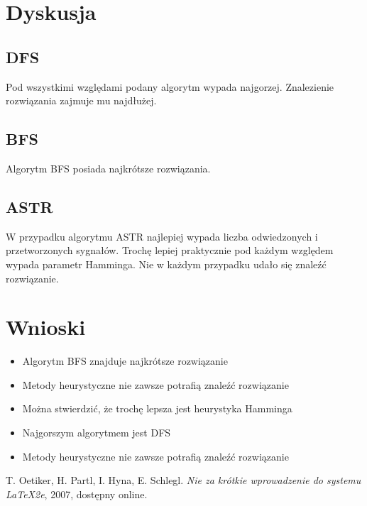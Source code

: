 \documentclass{classrep}
\begin{document}
    \section{Dyskusja} {
        \subsection{DFS}{
            Pod wszystkimi względami podany algorytm wypada najgorzej. Znalezienie rozwiązania zajmuje mu najdłużej.
        }
    
        \subsection{BFS}{
            Algorytm BFS posiada najkrótsze rozwiązania.
        }
    
        \subsection{ASTR}{
            W przypadku algorytmu ASTR najlepiej wypada liczba odwiedzonych i przetworzonych sygnałów. Trochę lepiej praktycznie pod każdym względem wypada parametr Hamminga. Nie w każdym przypadku udało się znaleźć rozwiązanie.
        }
    }

    \section{Wnioski} {
        \begin{itemize}
            \item Algorytm BFS znajduje najkrótsze rozwiązanie
            \item Metody heurystyczne nie zawsze potrafią znaleźć rozwiązanie
            \item Można stwierdzić, że trochę lepsza jest heurystyka Hamminga
            \item Najgorszym algorytmem jest DFS
            \item Metody heurystyczne nie zawsze potrafią znaleźć rozwiązanie
        \end{itemize}}
    
    \begin{thebibliography}{0}
         T. Oetiker, H. Partl, I. Hyna, E. Schlegl.
        \textsl{Nie za krótkie wprowadzenie do systemu \LaTeX2e}, 2007, dostępny
        online.
    \end{thebibliography}
\end{document}
